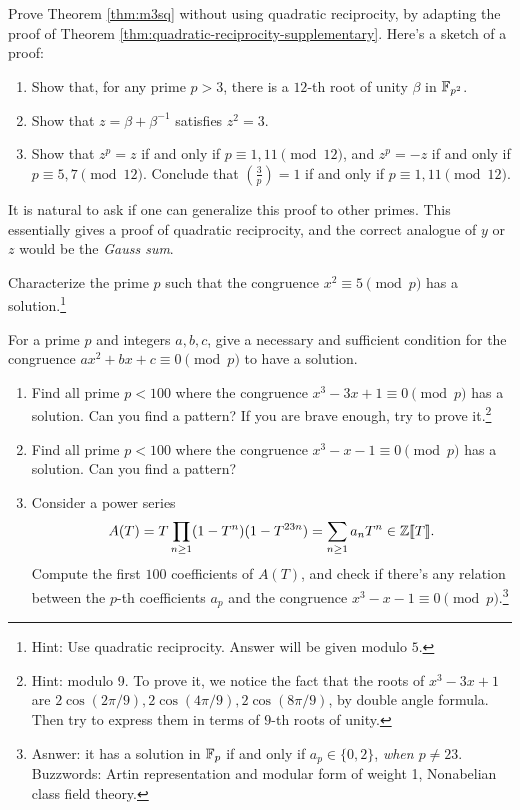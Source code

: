 \begin{exercise}
    Prove Theorem \ref{thm:m3sq} without using quadratic reciprocity, by adapting the proof of Theorem \ref{thm:quadratic-reciprocity-supplementary}.
    Here's a sketch of a proof:
    \begin{enumerate}
        \item Show that, for any prime $p > 3$, there is a $12$-th root of unity $\beta$ in $\mathbb{F}_{p^2}$.
        \item Show that $z = \beta + \beta^{-1}$ satisfies $z^2 = 3$.
        \item Show that $z^p = z$ if and only if $p \equiv 1, 11 \pmod{12}$, and $z^p = -z$ if and only if $p \equiv 5, 7 \pmod{12}$. Conclude that $\left(\frac{3}{p}\right) = 1$ if and only if $p \equiv 1, 11 \pmod{12}$.
    \end{enumerate}
    It is natural to ask if one can generalize this proof to other primes.
    This essentially gives a proof of quadratic reciprocity, and the correct analogue of $y$ or $z$ would be the \emph{Gauss sum}.
\end{exercise}

\begin{exercise}
    Characterize the prime $p$ such that the congruence $x^2 \equiv 5 \pmod{p}$ has a solution.\footnote{Hint: Use quadratic reciprocity. Answer will be given modulo $5$.}
\end{exercise}

\begin{exercise}
    For a prime $p$ and integers $a, b, c$, give a necessary and sufficient condition for the congruence $ax^2 + bx + c \equiv 0 \pmod{p}$ to have a solution.
\end{exercise}

\begin{exercise}\sage
    \begin{enumerate}
        \item Find all prime $p < 100$ where the congruence $x^3 - 3x + 1 \equiv 0 \pmod{p}$ has a solution. Can you find a pattern? If you are brave enough, try to prove it.\footnote{Hint: modulo 9. To prove it, we notice the fact that the roots of $x^3 - 3x + 1$ are $2\cos (2\pi / 9), 2 \cos(4\pi/9), 2\cos(8\pi / 9)$, by double angle formula. Then try to express them in terms of $9$-th roots of unity.}
        \item Find all prime $p < 100$ where the congruence $x^3 - x - 1 \equiv 0 \pmod{p}$ has a solution. Can you find a pattern?
        \item Consider a power series
        \[
        A(T) = T \prod_{n \ge 1} (1 - T^n) (1 - T^{23 n}) = \sum_{n\ge 1} a_n T^n \in \mathbb{Z}\llbracket T \rrbracket.
        \]
        Compute the first $100$ coefficients of $A(T)$, and check if there's any relation between the $p$-th coefficients $a_p$ and the congruence $x^3 - x - 1 \equiv 0 \pmod{p}$.\footnote{Asnwer: it has a solution in $\mathbb{F}_p$ if and only if $a_p \in \{0, 2\}$, \emph{when $p \ne 23$}. Buzzwords: Artin representation and modular form of weight 1, Nonabelian class field theory.}
    \end{enumerate}    
\end{exercise}



